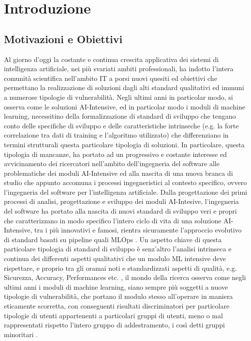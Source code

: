 \chapter{Introduzione}

\section{Motivazioni e Obiettivi} %
Al giorno d'oggi la costante e continua crescita applicativa dei sistemi di intelligenza artificiale, nei più svariati ambiti professionali, ha indotto l'intera comunità scientifica nell'ambito IT a porsi nuovi quesiti ed obiettivi che permettano la realizzazione di soluzioni dagli alti standard qualitativi ed immuni a numerose tipologie di vulnerabilità. Negli ultimi anni in particolar modo, si osserva come le soluzioni AI-Intensive, ed in particolar modo i moduli di machine learning, necessitino della formalizzazione di standard di sviluppo che tengano conto delle specifiche di sviluppo e delle caratteristiche intrinseche (e.g. la forte correlazione tra dati di training e l'algoritmo utilizzato) che differenziano in termini strutturali questa particolare tipologia di soluzioni. In particolare, questa tipologia di mancanze, ha portato ad un progressivo e costante interesse ed avvicinamento dei ricercatori nell'ambito dell'ingegneria del software alle problematiche dei moduli AI-Intensive \cite{rech2004artificial} ed alla nascita di una nuova branca di studio che appunto accomuna i processi ingegneristici al contesto specifico, ovvero l'ingegneria del software per l'intelligenza artificiale. Dalla progettazione dei primi processi di analisi, progettazione e sviluppo dei moduli AI-Intesive, l'ingegneria del software ha portato alla nascita di nuovi standard di sviluppo veri e propri che caratterizzano in modo specifico l'intero ciclo di vita di una soluzione AI-Intensive, tra i più innovativi e famosi, rientra sicuramente l'approccio evolutivo di standard basati su pipeline quali MLOps \cite{burkov2020machine}. Un aspetto chiave di questa particolare tipologia di standard di sviluppo è senz'altro l'analisi intrinseca e continua dei differenti aspetti qualitativi che un modulo ML intensive deve rispettare, e proprio tra gli oramai noti e standardizzati aspetti di qualità, e.g. Sicurezza, Accuracy, Performances etc. \cite{NFRForML}, il mondo della ricerca osserva come negli ultimi anni i moduli di machine learning, siano sempre più soggetti a nuove tipologie di vulnerabilità, che portano il modulo stesso all'operare in maniera eticamente scorretta, con conseguenti risultati discriminatori per particolare tipologie di utenti appartenenti a particolari gruppi di utenti, meno o mal rappresentati rispetto l'intero gruppo di addestramento, i così detti gruppi minoritari \cite{brun2018software}. \\

